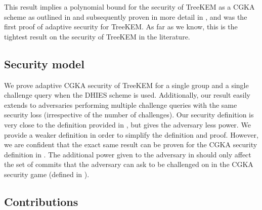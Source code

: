 This result implies a polynomial bound for the security of TreeKEM as a CGKA scheme as outlined in \cite[Theorem 4]{ttkem} and subsequently proven in more detail in \cite[Theorem 12]{modular-group-messaging}, and was the first proof of adaptive security for TreeKEM. As far as we know, this is the tightest result on the security of TreeKEM in the literature.

\subsection{Security model}

We prove adaptive CGKA security of TreeKEM for a single group and a single challenge query when the DHIES scheme is used. Additionally, our result easily extends to adversaries performing multiple challenge queries with the same security loss (irrespective of the number of challenges). Our security definition is very close to the definition provided in \cite[Section 4.1.2]{modular-group-messaging}, but gives the adversary less power. We provide a weaker definition in order to simplify the definition and proof. However, we are confident that the exact same result can be proven for the CGKA security definition in \cite{modular-group-messaging}. The additional power given to the adversary in \cite{modular-group-messaging} should only affect the set of commits that the adversary can ask to be challenged on in the CGKA security game (defined in \cite[Section~\ref*{sec:cgka}]{full-version}).

\subsection{Contributions}

